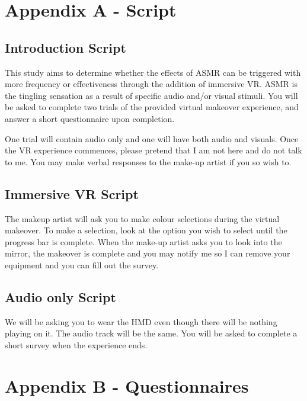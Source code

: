 \documentclass{sigchi}
\begin{document}
\clearpage
\nobalance
\appendix


\section{Appendix A - Script}
\label{appendix:script}
\subsection{Introduction Script}
This study aims to determine whether the effects of ASMR can be triggered with more frequency or effectiveness through the addition of immersive VR. ASMR is the tingling sensation as a result of specific audio and/or visual stimuli. You will be asked to complete two trials of the provided virtual makeover experience, and answer a short questionnaire upon completion.

One trial will contain audio only and one will have both audio and visuals. Once the VR experience commences, please pretend that I am not here and do not talk to me. You may make verbal responses to the make-up artist if you so wish to.

\subsection{Immersive VR Script}
The makeup artist will ask you to make colour selections during the virtual makeover. To make a selection, look at the option you wish to select until the progress bar is complete. When the make-up artist asks you to look into the mirror, the makeover is complete and you may notify me so I can remove your equipment and you can fill out the survey.

\subsection{Audio only Script}
We will be asking you to wear the HMD even though there will be nothing playing on it. The audio track will be the same. You will be asked to complete a short survey when the experience ends.



\section{Appendix B - Questionnaires}
\label{appendix:questionnaire}

\end{document}
